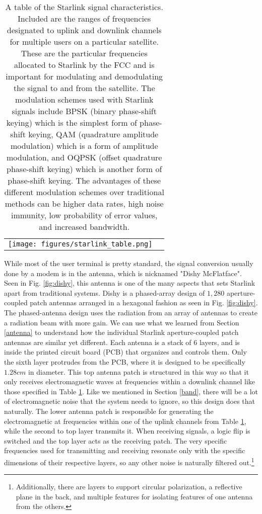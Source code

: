 \documentclass[10pt]{article}
\begin{document}
\begin{table}[ht]
\caption{A table of the Starlink signal characteristics. Included are the ranges of frequencies designated to uplink and downlink channels for multiple users on a particular satellite. These are the particular frequencies allocated to Starlink by the FCC and is important for modulating and demodulating the signal to and from the satellite. The modulation schemes used with Starlink signals include BPSK (binary phase-shift keying) which is the simplest form of phase-shift keying, QAM (quadrature amplitude modulation) which is a form of amplitude modulation, and OQPSK (offset quadrature phase-shift keying) which is another form of phase-shift keying. The advantages of these different modulation schemes over traditional methods can be higher data rates, high noise immunity, low probability of error values, and increased bandwidth\cite{starlink_table}.}
\centering
\begin{tabular}{cc}
\texttt{[image: figures/starlink\_table.png]}
\end{tabular}
\label{tab:starlink}
\end{table}

While most of the user terminal is pretty standard, the signal conversion usually done by a modem is in the antenna, which is nicknamed "Dishy McFlatface"\cite{How_does_Starlink_Satellite_Internet_Work}. Seen in Fig. \ref{fig:dishy}, this antenna is one of the many aspects that sets Starlink apart from traditional systems. Dishy is a phased-array design of $1,280$ aperture-coupled patch antennas arranged in a hexagonal fashion as seen in Fig. \ref{fig:dishy}. The phased-antenna design uses the radiation from an array of antennas to create a radiation beam with more gain. We can use what we learned from Section \ref{antenna} to understand how the individual Starlink aperture-coupled patch antennas are similar yet different. Each antenna is a stack of $6$ layers, and is inside the printed circuit board (PCB) that organizes and controls them. Only the sixth layer protrudes from the PCB, where it is designed to be specifically $1.28\si{cm}$ in diameter. This top antenna patch is structured in this way so that it only receives electromagnetic waves at frequencies within a downlink channel like those specified in Table \ref{tab:starlink}. Like we mentioned in Section \ref{band}, there will be a lot of electromagnetic noise that the system needs to ignore, so this design does that naturally. The lower antenna patch is responsible for generating the electromagnetic at frequencies within one of the uplink channels from Table \ref{tab:starlink}, while the second to top layer transmits it. When receiving signals, a logic flip is switched and the top layer acts as the receiving patch. The very specific frequencies used for transmitting and receiving resonate only with the specific dimensions of their respective layers, so any other noise is naturally filtered out.\footnote{Additionally, there are layers to support circular polarization, a reflective plane in the back, and multiple features for isolating features of one antenna from the others.}
\end{document}

